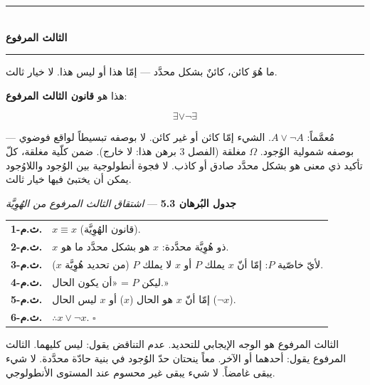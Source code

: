 \documentclass[10pt, openany, oneside]{book}
\renewcommand{\normalsize}{\fontsize{10}{13}\selectfont}
\renewcommand{\footnotesize}{\fontsize{8.5}{11}\selectfont}
\begin{document}

\begin{center}
    \rule{0.3\textwidth}{0.4pt}\\[0.5em]
    {\normalsize\bfseries الثالث المرفوع}\\[0.3em]
    \rule{0.3\textwidth}{0.4pt}
\end{center}

\vspace{1em}

\noindent ما هُوَ كائن، كائنٌ بشكل محدَّد --- إمّا هذا أو ليس هذا. لا خيار ثالث.

هذا هو \textbf{قانون الثالث المرفوع}:

$$\exists \vee \neg\exists$$

مُعمَّماً: $A \vee \neg A$. الشيء إمّا كائن أو غير كائن. لا بوصفه تبسيطاً لواقع فوضوي --- بوصفه شمولية الوُجود. $\Omega$ مغلقة (الفصل 3 برهن هذا: لا خارج). ضمن كلّية مغلقة، كلّ تأكيد ذي معنى هو بشكل محدَّد صادق أو كاذب. لا فجوة أنطولوجية بين الوُجود واللاوُجود يمكن أن يختبئ فيها خيار ثالث.

\vspace{0.5em}

\textbf{جدول البُرهان 5.3} --- \textit{اشتقاق الثالث المرفوع من الهُوِيَّة}

\vspace{0.5em}

{\footnotesize
\noindent\begin{tabular}{r p{}}
\textbf{ث.م-1.} & $x \equiv x$ (قانون الهُوِيَّة). \\[0.3em]
\textbf{ث.م-2.} & $x$ ذو هُوِيَّة محدَّدة: $x$ هو بشكل محدَّد ما هو. \\[0.3em]
\textbf{ث.م-3.} & لأيّ خاصّية $P$: إمّا أنّ $x$ يملك $P$ أو $x$ لا يملك $P$ (من تحديد هُوِيَّة $x$). \\[0.3em]
\textbf{ث.م-4.} & ليكن $P$ = «أن يكون الحال.» \\[0.3em]
\textbf{ث.م-5.} & إمّا أنّ $x$ هو الحال ($x$) أو $x$ ليس الحال ($\neg x$). \\[0.3em]
\textbf{ث.م-6.} & $\therefore x \vee \neg x$. $\square$ \\[0.3em]
\end{tabular}
}

\vspace{0.8em}

\noindent الثالث المرفوع هو الوجه الإيجابي للتحديد. عدم التناقض يقول: ليس كليهما. الثالث المرفوع يقول: أحدهما أو الآخر. معاً ينحتان حدّ الوُجود في بنية حادّة محدَّدة. لا شيء يبقى غامضاً. لا شيء يبقى غير محسوم عند المستوى الأنطولوجي.
\end{document}
